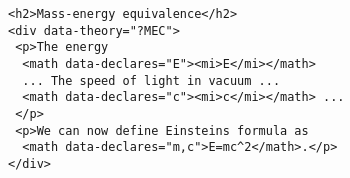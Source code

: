 \begin{lstlisting}
<h2>Mass-energy equivalence</h2>
<div data-theory="?MEC">
 <p>The energy
  <math data-declares="E"><mi>E</mi></math>
  ... The speed of light in vacuum ... 
  <math data-declares="c"><mi>c</mi></math> ...
 </p>
 <p>We can now define Einsteins formula as 
  <math data-declares="m,c">E=mc^2</math>.</p>
</div>
\end{lstlisting}
